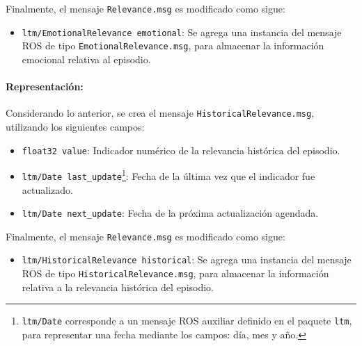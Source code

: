 Finalmente, el mensaje \texttt{Relevance.msg} es modificado como sigue:
\begin{itemize}
	\item \texttt{ltm/EmotionalRelevance emotional}: Se agrega una instancia del mensaje ROS de tipo \texttt{EmotionalRelevance.msg}, para almacenar la información emocional relativa al episodio.
\end{itemize}


\paragraph{Representación:}
Considerando lo anterior, se crea el mensaje \texttt{HistoricalRelevance.msg}, utilizando los siguientes campos:
\begin{itemize}
	\item \texttt{float32 value}: Indicador numérico de la relevancia histórica del episodio.
	\item \texttt{ltm/Date last\_update}\footnote{\texttt{ltm/Date} corresponde a un mensaje ROS auxiliar definido en el paquete \texttt{ltm}, para representar una fecha mediante los campos: día, mes y año.}: Fecha de la última vez que el indicador fue actualizado.
	\item \texttt{ltm/Date next\_update}: Fecha de la próxima actualización agendada.
\end{itemize}

Finalmente, el mensaje \texttt{Relevance.msg} es modificado como sigue:
\begin{itemize}
	\item \texttt{ltm/HistoricalRelevance historical}: Se agrega una instancia del mensaje ROS de tipo \texttt{HistoricalRelevance.msg}, para almacenar la información relativa a la relevancia histórica del episodio.
\end{itemize}

